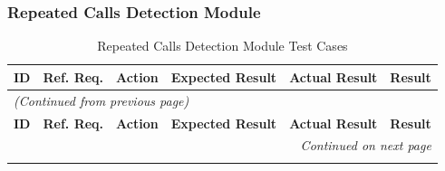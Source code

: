 \documentclass[12pt, titlepage]{article}
\begin{document}
\subsubsection{Repeated Calls Detection Module}

\begin{longtable}{c 
  >{\raggedright\arraybackslash}p{1.5cm} 
  >{\raggedright\arraybackslash}p{4.5cm} 
  >{\raggedright\arraybackslash}p{4cm} 
  >{\raggedright\arraybackslash}p{3cm} c}
  \toprule
  \textbf{ID} & \textbf{Ref. Req.} & \textbf{Action} & \textbf{Expected Result} & \textbf{Actual Result} & \textbf{Result} \\ 
  \midrule
  \endfirsthead

  \multicolumn{6}{l}{\textit{(Continued from previous page)}} \\ 
  \toprule
  \textbf{ID} & \textbf{Ref. Req.} & \textbf{Action} & \textbf{Expected Result} & \textbf{Actual Result} & \textbf{Result} \\ 
  \midrule
  \endhead

  \multicolumn{6}{r}{\textit{Continued on next page}} \\
  \endfoot

  \bottomrule
  \caption{Repeated Calls Detection Module Test Cases}
  \label{table:crc_tests}
  \endlastfoot


\end{longtable}
\end{document}
